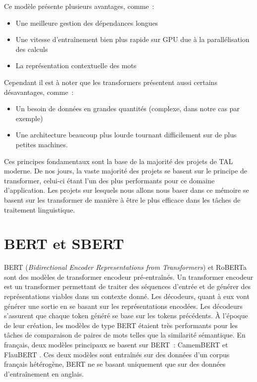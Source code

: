 Ce modèle présente plusieurs avantages, comme~:
\begin{itemize}
    \item Une meilleure gestion des dépendances longues
    \item Une vitesse d'entraînement bien plus rapide sur GPU due à la parallélisation des calculs
    \item La représentation contextuelle des mots
\end{itemize}

Cependant il est à noter que les transformers présentent aussi certains désavantages, comme~:
\begin{itemize}
    \item Un besoin de données en grandes quantités (complexe, dans notre cas par exemple)
    \item Une architecture beaucoup plus lourde tournant difficilement sur de plus petites machines.
\end{itemize}

Ces principes fondamentaux sont la base de la majorité des projets de TAL moderne. De nos jours, la vaste majorité
des projets se basent sur le principe de transformer, celui-ci étant l'un des plus performants pour ce domaine
d'application. Les projets sur lesquels nous allons nous baser dans ce mémoire se basent sur les transformer de
manière à être le plus efficace dans les tâches de traitement linguistique.

\section{BERT et SBERT}

BERT \citep{devlin_2019} (\textit{Bidirectional Encoder Representations from Transformers}) et RoBERTa
\citep{liu_2019} sont des modèles de transformer encodeur pré-entraînés. Un transformer encodeur est un transformer permettant
de traiter des séquences d'entrée et de générer des représentations viables dans un contexte donné. Les décodeurs, quant à eux
vont générer une sortie en se basant sur les représentations encodées. Les décodeurs s'assurent que chaque token généré
se base sur les tokens précédents. À l'époque de leur création, les modèles de type BERT
étaient très performants pour les tâches de comparaison de paires de mots telles que la \gls{similarité sémantique}.
En français, deux modèles principaux se basent sur BERT~: CamemBERT
\citep{martin_2020} et FlauBERT \citep{le_2020}. Ces deux modèles sont entraînés sur des données d'un corpus
français hétérogène, BERT ne se basant uniquement que sur des données d'entraînement en anglais.

